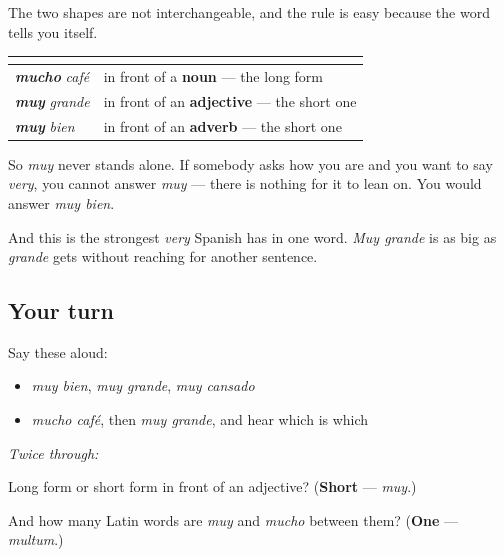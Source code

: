 \begin{culture}
The two shapes are not interchangeable, and the rule is easy because the word tells you itself.

\noindent
\begin{tabularx}{\linewidth}{@{}>{\raggedright\arraybackslash}X>{\raggedright\arraybackslash}X@{}}
\toprule
\textbf{} & \textbf{} \\
\midrule
\emph{\textbf{mucho}} \emph{café} & in front of a \textbf{noun} — the long form \\
\emph{\textbf{muy}} \emph{grande} & in front of an \textbf{adjective} — the short one \\
\emph{\textbf{muy}} \emph{bien} & in front of an \textbf{adverb} — the short one \\
\bottomrule
\end{tabularx}

So \emph{muy} never stands alone. If somebody asks how you are and you want to say \emph{very}, you cannot answer \emph{muy} — there is nothing for it to lean on. You would answer \emph{muy bien}.

And this is the strongest \emph{very} Spanish has in one word. \emph{Muy grande} is as big as \emph{grande} gets without reaching for another sentence.
\end{culture}

\subsection*{Your turn}
Say these aloud:

\begin{itemize}
\raggedright
  \item \emph{muy bien}, \emph{muy grande}, \emph{muy cansado}
  \item \emph{mucho café}, then \emph{muy grande}, and hear which is which
\end{itemize}

\emph{Twice through:}

\begin{tcolorbox}[breakable,colback=teal!4,colframe=teal!35!black,title={Before you move on}]
Long form or short form in front of an adjective? (\textbf{Short} — \emph{muy}.)

And how many Latin words are \emph{muy} and \emph{mucho} between them? (\textbf{One} — \emph{multum}.)
\end{tcolorbox}
